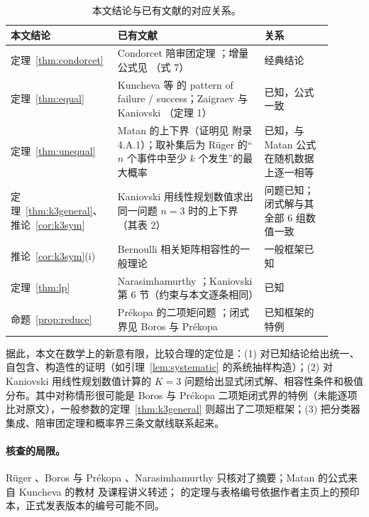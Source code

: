 \documentclass[11pt]{article}
\begin{document}
\begin{table}[H]
\centering
\small
\renewcommand{\arraystretch}{1.25}
\begin{tabular}{>{\raggedright\arraybackslash}p{0.27\linewidth}>{\raggedright\arraybackslash}p{0.43\linewidth}>{\raggedright\arraybackslash}p{0.20\linewidth}}
\toprule
本文结论 & 已有文献 & 关系\\
\midrule
定理~\ref{thm:condorcet} & Condorcet 陪审团定理 \cite{condorcet}；增量公式见 \cite{shteingart}（式 7） & 经典结论\\
定理~\ref{thm:equal} & Kuncheva 等 \cite{kuncheva2003} 的 pattern of failure / success；Zaigraev 与 Kaniovski \cite{zk2012}（定理 1） & 已知，公式一致\\
定理~\ref{thm:unequal} & Matan \cite{matan} 的上下界（证明见 \cite{kunchevabook} 附录 4.A.1）；取补集后为 Rüger \cite{ruger} 的“$n$ 个事件中至少 $k$ 个发生”的最大概率 & 已知，与 Matan 公式在随机数据上逐一相等\\
定理~\ref{thm:k3general}、推论~\ref{cor:k3sym} & Kaniovski \cite{kaniovski2010} 用线性规划数值求出同一问题 $n=3$ 时的上下界（其表 2） & 问题已知；闭式解与其全部 6 组数值一致\\
推论~\ref{cor:k3sym}(i) & Bernoulli 相关矩阵相容性的一般理论 \cite{chaganty} & 一般框架已知\\
定理~\ref{thm:lp} & Narasimhamurthy \cite{nara2003,nara2005}；Kaniovski \cite{kaniovski2010} 第 6 节（约束与本文逐条相同） & 已知\\
命题~\ref{prop:reduce} & Prékopa 的二项矩问题 \cite{prekopa1988,prekopa1990}；闭式界见 Boros 与 Prékopa \cite{borosprekopa} & 已知框架的特例\\
\bottomrule
\end{tabular}
\caption{本文结论与已有文献的对应关系。}
\label{tab:lit}
\end{table}

据此，本文在数学上的新意有限，比较合理的定位是：(1) 对已知结论给出统一、自包含、构造性的证明（如引理~\ref{lem:systematic} 的系统抽样构造）；(2) 对 Kaniovski \cite{kaniovski2010} 用线性规划数值计算的 $K=3$ 问题给出显式闭式解、相容性条件和极值分布。其中对称情形很可能是 Boros 与 Prékopa \cite{borosprekopa} 二项矩闭式界的特例（未能逐项比对原文），一般参数的定理~\ref{thm:k3general} 则超出了二项矩框架；(3) 把分类器集成、陪审团定理和概率界三条文献线联系起来。

\paragraph{核查的局限。}Rüger \cite{ruger}、Boros 与 Prékopa \cite{borosprekopa}、Narasimhamurthy \cite{nara2005} 只核对了摘要；Matan \cite{matan} 的公式来自 Kuncheva 的教材 \cite{kunchevabook} 及课程讲义转述；\cite{kaniovski2010,zk2012} 的定理与表格编号依据作者主页上的预印本，正式发表版本的编号可能不同。
\end{document}
